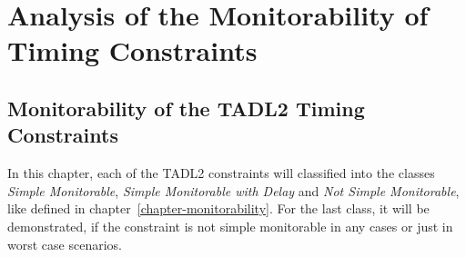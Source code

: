 \chapter{Analysis of the Monitorability of Timing Constraints}

\section{Monitorability of the TADL2 Timing Constraints}
	In this chapter, each of the TADL2 constraints will classified into the classes \emph{Simple Monitorable}, \emph{Simple Monitorable with Delay} and \emph{Not Simple Monitorable}, like defined in chapter~\ref{chapter-monitorability}. For the last class, it will be demonstrated, if the constraint is not simple monitorable in any cases or just in worst case scenarios.

